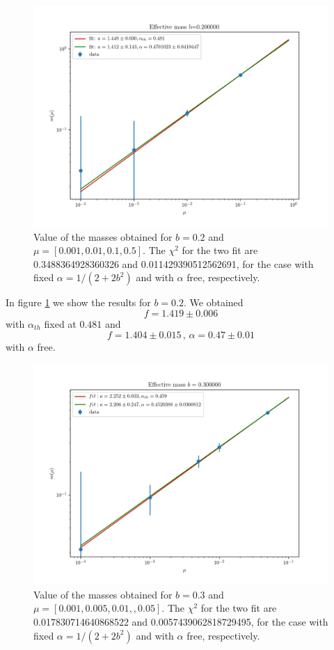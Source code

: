 \documentclass[12pt,a4paper]{report}
\begin{document}
\begin{figure}
\label{fig:mass_scaling_b0.2}
\centering
\includegraphics[width=1.0\textwidth]{b0_2}
\caption{Value of the masses obtained for $b=0.2$ and 
$\mu = [0.001,0.01,0.1,0.5]$. The $\chi^2$ for the two fit are 0.3488364928360326 and 0.011429390512562691, for the case with fixed $\alpha = 1/(2+2b^2)$ and with $\alpha$ free, respectively.}
\end{figure}

In figure \ref{fig:mass_scaling_b0.2} we show the results for $b=0.2$. We obtained \begin{equation}
f = 1.419 \pm 0.006
\end{equation} with $\alpha_{th}$ fixed at $0.481$ and \begin{equation}
f= 1.404 \pm 0.015 \,,\, \alpha = 0.47 \pm 0.01
\end{equation} with $\alpha$ free.

\begin{figure}
\label{fig:mass_scaling_b0.3}
\centering
\includegraphics[width=1.0\textwidth]{b0_3}
\caption{Value of the masses obtained for $b=0.3$ and 
$\mu = [0.001,0.005,0.01,,0.05]$. The $\chi^2$ for the two fit are 0.017830714640868522 and 0.0057439062818729495, for the case with fixed $\alpha = 1/(2+2b^2)$ and with $\alpha$ free, respectively.}
\end{figure}
\end{document}
